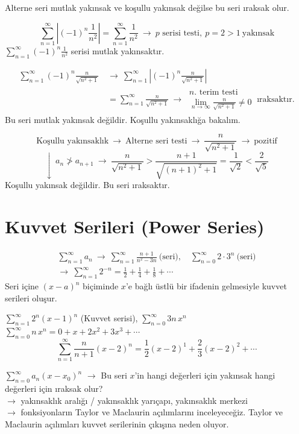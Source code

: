 \documentclass[11pt,a4paper]{article}
\begin{document}
Alterne seri mutlak yakınsak ve koşullu yakınsak değilse bu seri ıraksak olur.

\[ \sum_{n=1}^{\infty}\left|(-1)^n\frac{1}{n^2}\right|=\sum_{n=1}^{\infty}\frac{1}{n^2}\ \to\ \text{$p$ serisi testi},\ p=2>1\ \text{yakınsak} \]
$\displaystyle\sum_{n=1}^{\infty}(-1)^n\frac{1}{n^2}$ serisi mutlak yakınsaktır.

\begin{align*}
\sum_{n=1}^{\infty}(-1)^n\frac{n}{\sqrt{n^2+1}}\ &\to\ \sum_{n=1}^{\infty}\left|(-1)^n\frac{n}{\sqrt{n^2+1}}\right|\\
&=\sum_{n=1}^{\infty}\frac{n}{\sqrt{n^2+1}}\ \to\ \begin{array}{c}\text{$n$. terim testi}\\ \displaystyle\lim_{n\to\infty}\frac{n}{\sqrt{n^2+1}}\neq0\end{array}\ \text{ıraksaktır.}
\end{align*}
Bu seri mutlak yakınsak değildir. Koşullu yakınsaklığa bakalım.

\[ \text{Koşullu yakınsaklık}\ \to\ \text{Alterne seri testi}\ \to\ \frac{n}{\sqrt{n^2+1}}\ \to\ \text{pozitif} \]
\[ \downarrow\ a_n\not>a_{n+1}\ \to\ \frac{n}{\sqrt{n^2+1}}>\frac{n+1}{\sqrt{(n+1)^2+1}}=\frac{1}{\sqrt2}<\frac{2}{\sqrt5} \]
Koşullu yakınsak değildir. Bu seri ıraksaktır.

\section{Kuvvet Serileri (Power Series)}
\begin{gather*}
\sum_{n=1}^{\infty}a_n\ \to\ \sum_{n=1}^{\infty}\frac{n+1}{n^2-3n}\ \text{(seri)},\quad \sum_{n=0}^{\infty}2\cdot3^n\ \text{(seri)}\\
\to\ \sum_{n=1}^{\infty}2^{-n}=\frac12+\frac14+\frac18+\cdots
\end{gather*}
Seri içine $(x-a)^n$ biçiminde $x$'e bağlı üstlü bir ifadenin gelmesiyle kuvvet serileri oluşur.

$\displaystyle\sum_{n=1}^{\infty}2^n(x-1)^n$ (Kuvvet serisi), $\displaystyle\sum_{n=0}^{\infty}3n\,x^n$ \qquad $\displaystyle\sum_{n=0}^{\infty}n\,x^n=0+x+2x^2+3x^3+\cdots$
\[ \sum_{n=1}^{\infty}\frac{n}{n+1}(x-2)^n=\frac12(x-2)^1+\frac23(x-2)^2+\cdots \]

$\displaystyle\sum_{n=0}^{\infty}a_n(x-x_0)^n$ $\to$ Bu seri $x$'in hangi değerleri için yakınsak hangi değerleri için ıraksak olur?\\
$\to$ yakınsaklık aralığı / yakınsaklık yarıçapı, yakınsaklık merkezi\\
$\to$ fonksiyonların Taylor ve Maclaurin açılımlarını inceleyeceğiz. Taylor ve Maclaurin açılımları kuvvet serilerinin çıkışına neden oluyor.
\end{document}
